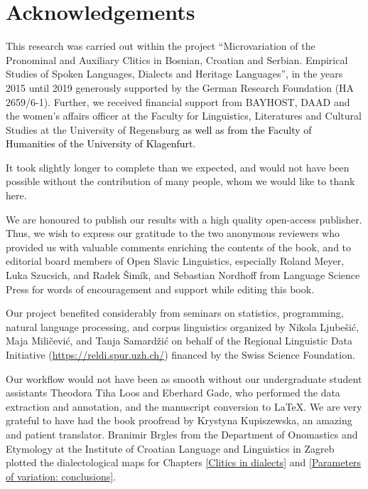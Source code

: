 \chapter{Acknowledgements}

This research was carried out within the project “Microvariation of the Pronominal and Auxiliary Clitics in Bosnian, Croatian and Serbian. Empirical Studies of Spoken Languages, Dialects and Heritage Languages”, in the years 2015 until 2019 generously supported by the German Research Foundation (HA 2659/6-1). Further, we received financial support from BAYHOST, DAAD and the women’s affairs officer at the Faculty for Linguistics, Literatures and Cultural Studies at the University of Regensburg \textcolor{black}{as well as from the Faculty of Humanities of the University of Klagenfurt}. 

It took slightly longer to complete than we expected, and would not have been possible without the contribution of many people, whom we would like to thank here.

We are honoured to publish our results with a high quality open-access publisher. Thus, we wish to express our gratitude to the two anonymous reviewers who provided us with valuable comments enriching the contents of the book, and to editorial board members of Open Slavic Linguistics, especially Roland Meyer, Luka Szucsich, and Radek Šimík, and Sebastian Nordhoff from Language Science Press for words of encouragement and support while editing this book.

Our project benefited considerably from seminars on statistics, programming, natural language processing, and corpus linguistics organized by Nikola Ljubešić, Maja Miličević, and Tanja Samardžić on behalf of the Regional Linguistic Data Initiative (\url{https://reldi.spur.uzh.ch/}) financed by the Swiss Science Foundation.

Our workflow would not have been as smooth without our undergraduate student assistants Theodora Tiha Loos and Eberhard Gade, who performed the data extraction and annotation, and the manuscript conversion to \LaTeX. We are very grateful to have had the book proofread by Krystyna Kupiszewska, an amazing and patient translator. Branimir Brgles from the Department of Onomastics and Etymology at the Institute of Croatian Language and Linguistics in Zagreb plotted the dialectological maps for Chapters \ref{Clitics in dialects} and \ref{Parameters of variation: conclusions}.

